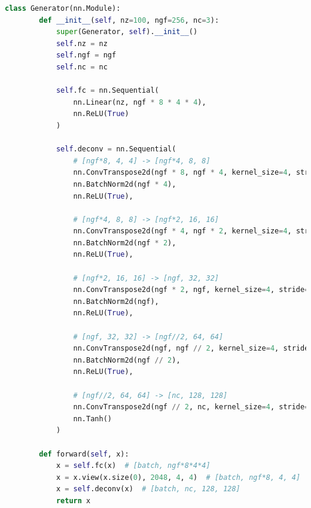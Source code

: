 \documentclass[UTF8]{ctexart}
\begin{document}
\begin{lstlisting}[language=Python, caption={生成器设计}, label={lst:code2}, breaklines=true]
    class Generator(nn.Module):
        def __init__(self, nz=100, ngf=256, nc=3):
            super(Generator, self).__init__()
            self.nz = nz
            self.ngf = ngf
            self.nc = nc
    
            self.fc = nn.Sequential(
                nn.Linear(nz, ngf * 8 * 4 * 4),
                nn.ReLU(True)
            )
            
            self.deconv = nn.Sequential(
                # [ngf*8, 4, 4] -> [ngf*4, 8, 8]
                nn.ConvTranspose2d(ngf * 8, ngf * 4, kernel_size=4, stride=2, padding=1, bias=False),
                nn.BatchNorm2d(ngf * 4),
                nn.ReLU(True),
                
                # [ngf*4, 8, 8] -> [ngf*2, 16, 16]
                nn.ConvTranspose2d(ngf * 4, ngf * 2, kernel_size=4, stride=2, padding=1, bias=False),
                nn.BatchNorm2d(ngf * 2),
                nn.ReLU(True),
                
                # [ngf*2, 16, 16] -> [ngf, 32, 32]
                nn.ConvTranspose2d(ngf * 2, ngf, kernel_size=4, stride=2, padding=1, bias=False),
                nn.BatchNorm2d(ngf),
                nn.ReLU(True),
                
                # [ngf, 32, 32] -> [ngf//2, 64, 64]
                nn.ConvTranspose2d(ngf, ngf // 2, kernel_size=4, stride=2, padding=1, bias=False),
                nn.BatchNorm2d(ngf // 2),
                nn.ReLU(True),
                
                # [ngf//2, 64, 64] -> [nc, 128, 128]
                nn.ConvTranspose2d(ngf // 2, nc, kernel_size=4, stride=2, padding=1, bias=False),
                nn.Tanh()
            )
        
        def forward(self, x):
            x = self.fc(x)  # [batch, ngf*8*4*4]
            x = x.view(x.size(0), 2048, 4, 4)  # [batch, ngf*8, 4, 4]
            x = self.deconv(x)  # [batch, nc, 128, 128]
            return x
    \end{lstlisting}
\end{document}
